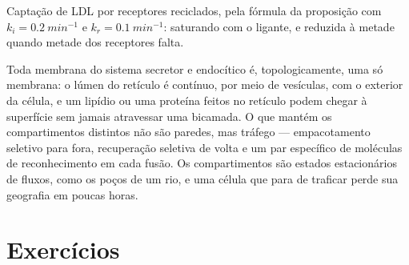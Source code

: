 \begin{omfigure}

{\small Captação de LDL por receptores reciclados, pela fórmula da
proposição com $k_{i} = \qty{0.2}{min^{-1}}$ e
$k_{r} =
\qty{0.1}{min^{-1}}$: saturando com o ligante, e reduzida à
metade quando metade dos receptores falta.}
\end{omfigure}

\begin{remark}\label{rem:b3:membrane-traffic:one-membrane}
Toda membrana do sistema secretor e endocítico é, topologicamente, uma
só membrana: o lúmen do retículo é contínuo, por meio de vesículas, com
o exterior da célula, e um lipídio ou uma proteína feitos no retículo
podem chegar à superfície sem jamais atravessar uma bicamada. O que
mantém os compartimentos distintos não são paredes, mas tráfego ---
empacotamento seletivo para fora, recuperação seletiva de volta e um
par específico de moléculas de reconhecimento em cada fusão. Os
compartimentos são estados estacionários de fluxos, como os poços de um
rio, e uma célula que para de traficar perde sua geografia em poucas
horas.
\end{remark}

\section{Exercícios}

